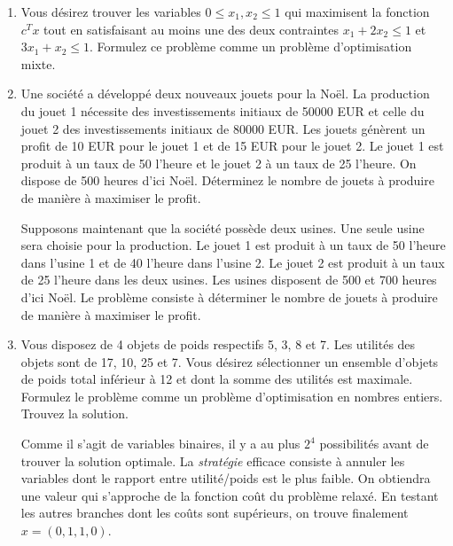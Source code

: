 \begin{enumerate}
  \item Vous désirez trouver les variables $0 \leq x_1, x_2 \leq 1$ qui maximisent la fonction $c^T x$ tout en satisfaisant au
    moins une  des deux contraintes $x_1 + 2 x_2 \leq 1$  et  $3 x_1 +  x_2 \leq 1$. Formulez ce problème comme un
    problème d'optimisation mixte.



    \begin{solution}
      \nosolution
    \end{solution}

  \item Une société a développé deux nouveaux jouets pour la Noël. La production du jouet 1 nécessite des investissements initiaux de
    50000 EUR et celle du jouet 2 des investissements initiaux de 80000 EUR. Les jouets
    génèrent un profit de 10 EUR pour le jouet 1 et de 15 EUR pour le jouet 2.  Le jouet 1 est
    produit à un taux de 50 l'heure et le jouet 2 à un taux de 25 l'heure. On dispose  de 500 heures
    d'ici Noël. Déterminez le nombre de jouets à produire de manière à maximiser le profit.


    Supposons maintenant que la société possède deux usines. Une seule usine sera choisie pour la production. Le
    jouet 1 est produit à un taux de 50 l'heure dans l'usine 1 et de 40 l'heure dans l'usine 2. Le jouet 2 est produit à un taux de
    25 l'heure dans les deux usines. Les usines disposent de 500 et 700 heures d'ici Noël.  Le problème consiste à déterminer le
    nombre de jouets à produire de manière à maximiser le profit.












    \begin{solution}
      \nosolution
    \end{solution}

  \item Vous disposez de 4 objets de poids respectifs 5, 3, 8 et 7. Les utilités des
    objets sont de 17, 10, 25 et 7. Vous désirez sélectionner un ensemble d'objets de poids total inférieur  à 12 et dont la somme
    des utilités est maximale.  Formulez le problème comme un problème d'optimisation en nombres entiers. Trouvez la solution.


    \begin{solution}
      Comme il s'agit de variables binaires, il y a au plus $2^{4}$ possibilités avant de trouver la solution optimale. La \textit{stratégie} efficace consiste à annuler les variables dont le rapport entre utilité/poids est le plus faible. On obtiendra une valeur qui s'approche de la fonction coût du problème relaxé. En testant les autres branches dont les coûts sont supérieurs, on trouve finalement $x = (0,1,1,0)$.
    \end{solution}


\end{enumerate}
